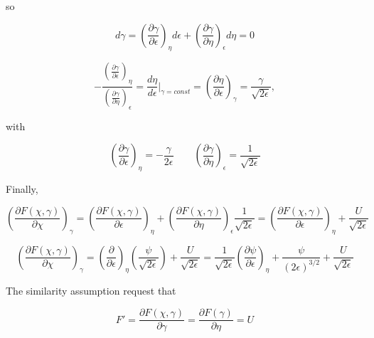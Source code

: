 so  

\begin{equation*} 
d\gamma
=
\left(
\frac{\partial \gamma}{\partial \epsilon}
\right)_\eta
d\epsilon
+
\left(
\frac{\partial \gamma}{\partial \eta}
\right)_\epsilon
d\eta
=
0
\end{equation*}  

\begin{equation*} 
-
\dfrac{\left(
\frac{\partial \gamma}{\partial \epsilon}
\right)_\eta
}
{
\left(
\frac{\partial \gamma}{\partial \eta}
\right)_\epsilon
}
=
\frac{d\eta}{d\epsilon}
\bigg |_{\gamma=const}
=
\left(
\frac{\partial \eta}{\partial \epsilon}
\right)_\gamma
=
\frac{\gamma}{\sqrt{2\epsilon}}
,
\end{equation*} 

with 

\begin{equation*} 
\left(
\frac{\partial \gamma}{\partial \epsilon}
\right)_\eta
=
-
\frac{\gamma}{2\epsilon}
\qquad
\left(
\frac{\partial \gamma}{\partial \eta}
\right)_\epsilon
=\frac{1}{\sqrt{2\epsilon}}
\end{equation*} 

Finally, 

\begin{equation*} 
\left(
    \frac{\partial F(\chi,\gamma)}{\partial \chi}
\right)_\gamma
=
\left(
\frac{\partial F(\chi,\gamma)}{\partial \epsilon}
\right)_\eta
+
\left(
\frac{\partial F(\chi,\gamma)}{\partial \eta}
\right)_\epsilon
\frac{1}{\sqrt{2\epsilon}}
=
\left(
\frac{\partial F(\chi,\gamma)}{\partial \epsilon}
\right)_\eta
+
\frac{U}{\sqrt{2\epsilon}}
\end{equation*}  

\begin{equation*} 
\left(
    \frac{\partial F(\chi,\gamma)}{\partial \chi}
\right)_\gamma
=
\left(
\frac{\partial }{\partial \epsilon}
\right)_\eta
\left(
\frac{\psi}{\sqrt{2\epsilon}}
\right)
+
\frac{U}{\sqrt{2\epsilon}}
=
\frac{1}{\sqrt{2\epsilon}}
\left(
\frac{\partial \psi}{\partial \epsilon}
\right)_\eta
+
\frac{\psi}{{(2\epsilon)}^{3/2}}
+
\frac{U}{\sqrt{2\epsilon}}
\end{equation*}  

The similarity assumption request that 

\begin{equation*} 
F'=
\frac{\partial F(\chi,\gamma)}{\partial \gamma}
=
\frac{\partial F(\gamma) }{\partial \eta}
=
U
\end{equation*}  

